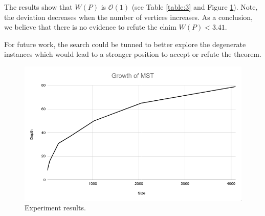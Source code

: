 \documentclass[12pt, a4paper]{article}
\begin{document}
The results show that $W(P)$ is $\mathcal{O}(1)$ (see Table \ref{table:3} and Figure \ref{fig:1}). Note, the deviation decreases when the number of vertices increases. As a conclusion, we  believe that there is no evidence to refute the claim $W(P) < 3.41$.

For future work, the search could be tunned to better explore the degenerate instances which would lead to a stronger position to accept or refute the theorem.

\begin{figure}[H]
  \center
  \includegraphics[scale=0.4]{plot}
  \caption{Experiment results.}
  \label{fig:1}
\end{figure}




\end{document}
